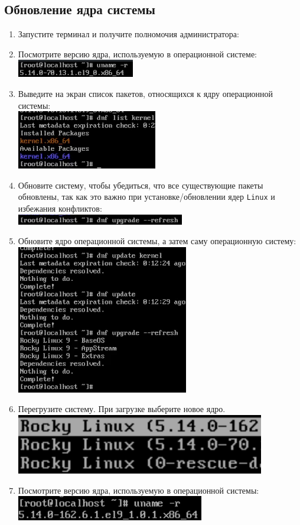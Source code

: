 \documentclass[12pt]{article}
\begin{document}
\subsection{Обновление ядра системы}
\begin{enumerate}
	\item Запустите терминал и получите полномочия администратора:
	\item Посмотрите версию ядра, используемую в операционной системе:
	      \\\includegraphics{12.png}
	\item Выведите на экран список пакетов, относящихся к ядру операционной системы:
	      \\\includegraphics{13.png}
	\item Обновите систему, чтобы убедиться, что все существующие пакеты обновлены, так как это важно при установке/обновлении ядер \texttt{Linux} и избежания конфликтов:
	      \\\includegraphics{14.png}
	\item Обновите ядро операционной системы, а затем саму операционную систему:
	      \\\includegraphics{15.png}
	\item Перегрузите систему. При загрузке выберите новое ядро.
	      \\\includegraphics{16.png}
	\item Посмотрите версию ядра, используемую в операционной системы:
	      \\\includegraphics{17.png}
\end{enumerate}
\end{document}
